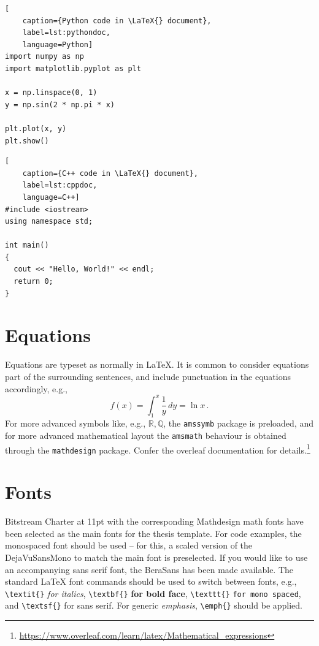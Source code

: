 



\begin{lstlisting}[
    caption={Python code in \LaTeX{} document},
    label=lst:pythondoc,
    language=Python]
import numpy as np
import matplotlib.pyplot as plt

x = np.linspace(0, 1)
y = np.sin(2 * np.pi * x)

plt.plot(x, y)
plt.show()
\end{lstlisting}

\begin{lstlisting}[
    caption={C++ code in \LaTeX{} document},
    label=lst:cppdoc,
    language=C++]
#include <iostream>
using namespace std;

int main() 
{
  cout << "Hello, World!" << endl;
  return 0;
}
\end{lstlisting}

\section{Equations}

Equations are typeset as normally in \LaTeX{}. It is common to consider equations part of the surrounding sentences, and include punctuation in the equations accordingly, e.g.,
\begin{equation}
    f(x) = \int_1^x \frac{1}{y}\,dy = \ln x\,.
    \label{eq:logarithm}
\end{equation}
For more advanced symbols like, e.g., $\mathbb{R}, \mathbb{Q}$, the \texttt{amssymb} package is preloaded, and for more advanced mathematical layout the \texttt{amsmath} behaviour is obtained through the \texttt{mathdesign} package. Confer the overleaf documentation for details.\footnote{\url{https://www.overleaf.com/learn/latex/Mathematical_expressions}}

\section{Fonts}

Bitstream Charter at 11pt with the corresponding Mathdesign math fonts have been selected as the main fonts for the thesis template. For code examples, the monospaced font should be used – for this, a scaled version of the DejaVuSansMono to match the main font is preselected. If you would like to use an accompanying sans serif font, the BeraSans has been made available. The standard \LaTeX{} font commands should be used to switch between fonts, e.g.,
\texttt{\textbackslash textit\{\}} \textit{for italics},
\texttt{\textbackslash textbf\{\}} \textbf{for bold face},
\texttt{\textbackslash texttt\{\}} \texttt{for mono spaced}, and
\texttt{\textbackslash textsf\{\}} \textsf{for sans serif}.
For generic \emph{emphasis}, \texttt{\textbackslash emph\{\}} should be applied.

